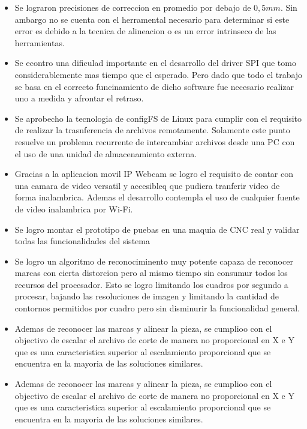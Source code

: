 \begin{itemize}
   \item{Se lograron precisiones de correccion en promedio por debajo de $0,5mm$. Sin ambargo no se cuenta con el herramental necesario para determinar si este error es debido a la tecnica de alineacion o es un error intrinseco de las herramientas.}

   \item{Se econtro una dificulad importante en el desarrollo del driver SPI que tomo considerablemente mas tiempo que el esperado. Pero dado que todo el trabajo se basa en el correcto funcinamiento de dicho software fue necesario realizar uno a medida y afrontar el retraso.}

   \item{Se aprobecho la tecnologia de configFS de Linux para cumplir con el requisito de realizar la trasnferencia de archivos remotamente. Solamente este punto resuelve un problema recurrente de intercambiar archivos desde una PC con el uso de una unidad de almacenamiento externa.}
   \item{Gracias a la aplicacion movil IP Webcam se logro el requisito de contar con una camara de video versatil y accesibleq que pudiera tranferir video de forma inalambrica. Ademas el desarrollo contempla el uso de cualquier fuente de video inalambrica por Wi-Fi.}

   \item{Se logro montar el prototipo de puebas en una maquia de CNC real y validar todas las funcionalidades del sistema}

   \item{Se logro un algoritmo de reconociminento muy potente capaza de reconocer marcas con cierta distorcion pero al mismo tiempo sin consumur todos los recursos del procesador. Esto se logro limitando los cuadros por segundo a procesar, bajando las resoluciones de imagen y limitando la cantidad de contornos permitidos por cuadro pero sin disminurir la funcionalidad general.}

   \item{Ademas de reconocer las marcas y alinear la pieza, se cumplioo con el objectivo de escalar el archivo de corte de manera no proporcional en X e Y que es una caracteristica superior al escalamiento proporcional que se encuentra en la mayoria de las soluciones similares.}

   \item{Ademas de reconocer las marcas y alinear la pieza, se cumplioo con el objectivo de escalar el archivo de corte de manera no proporcional en X e Y que es una caracteristica superior al escalamiento proporcional que se encuentra en la mayoria de las soluciones similares.}


\end{itemize}
